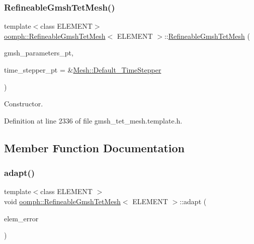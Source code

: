 \subsubsection{\texorpdfstring{Refineable\+Gmsh\+Tet\+Mesh()}{RefineableGmshTetMesh()}\hspace{0.1cm}{\footnotesize\ttfamily [2/2]}}
{\footnotesize\ttfamily template$<$class E\+L\+E\+M\+E\+NT$>$ \\
\hyperlink{classoomph_1_1RefineableGmshTetMesh}{oomph\+::\+Refineable\+Gmsh\+Tet\+Mesh}$<$ E\+L\+E\+M\+E\+NT $>$\+::\hyperlink{classoomph_1_1RefineableGmshTetMesh}{Refineable\+Gmsh\+Tet\+Mesh} (\begin{DoxyParamCaption}\item[{\hyperlink{classoomph_1_1GmshParameters}{Gmsh\+Parameters} $\ast$}]{gmsh\+\_\+parameters\+\_\+pt,  }\item[{\hyperlink{classoomph_1_1TimeStepper}{Time\+Stepper} $\ast$}]{time\+\_\+stepper\+\_\+pt = {\ttfamily \&\hyperlink{classoomph_1_1Mesh_a12243d0fee2b1fcee729ee5a4777ea10}{Mesh\+::\+Default\+\_\+\+Time\+Stepper}} }\end{DoxyParamCaption})\hspace{0.3cm}{\ttfamily [inline]}}



Constructor. 



Definition at line 2336 of file gmsh\+\_\+tet\+\_\+mesh.\+template.\+h.



\subsection{Member Function Documentation}
\mbox{\label{classoomph_1_1RefineableGmshTetMesh_ad3ee00690d125ab8211f64d5c85dd3b9}} 
\subsubsection{\texorpdfstring{adapt()}{adapt()}}
{\footnotesize\ttfamily template$<$class E\+L\+E\+M\+E\+NT $>$ \\
void \hyperlink{classoomph_1_1RefineableGmshTetMesh}{oomph\+::\+Refineable\+Gmsh\+Tet\+Mesh}$<$ E\+L\+E\+M\+E\+NT $>$\+::adapt (\begin{DoxyParamCaption}\item[{const \hyperlink{classoomph_1_1Vector}{Vector}$<$ double $>$ \&}]{elem\+\_\+error }\end{DoxyParamCaption})\hspace{0.3cm}{\ttfamily [virtual]}}



